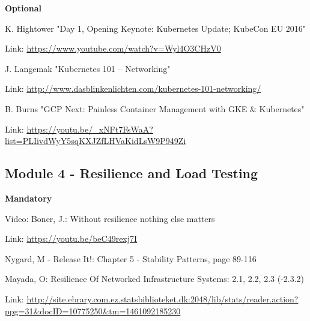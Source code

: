\noindent\textbf{Optional}
\begin{compactitem}
  \item K. Hightower "Day 1, Opening Keynote: Kubernetes Update; KubeCon EU 2016"
  \begin{compactitem}
  	\item Link: \url{https://www.youtube.com/watch?v=Wyl4O3CHzV0}
  \end{compactitem}
  
    \item J. Langemak "Kubernetes 101 – Networking"
  \begin{compactitem}
  	\item Link: \url{http://www.dasblinkenlichten.com/kubernetes-101-networking/}
  \end{compactitem}
  
      \item B. Burns "GCP Next: Painless Container Management with GKE \& Kubernetes"
  \begin{compactitem}
  	\item Link: \url{https://youtu.be/_xNFt7FsWaA?list=PLIivdWyY5sqKXJZfLHVaKidLsW9P949Zi}
  \end{compactitem}
\end{compactitem}

\subsection*{Module 4 - Resilience and Load Testing}
\textbf{Mandatory}
\begin{compactitem}
\setlength\itemsep{0.05em}
  \item Video: Boner, J.: Without resilience nothing else matters
  \begin{compactitem}
  	\item Link: \url{https://youtu.be/beC49rexj7I} 
  \end{compactitem}
  
  \item Nygard, M - Release It!: Chapter 5 - Stability Patterns, page 89-116

  \item Mayada, O: Resilience Of Networked Infrastructure Systems: 2.1, 2.2, 2.3 (-2.3.2)
  \begin{compactitem}
  	\item Link: \url{http://site.ebrary.com.ez.statsbiblioteket.dk:2048/lib/stats/reader.action?ppg=31&docID=10775250&tm=1461092185230} 
  \end{compactitem}
\end{compactitem}

